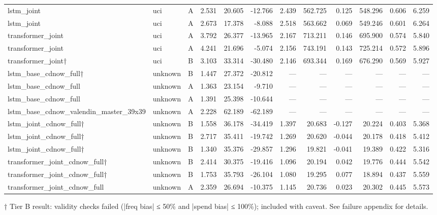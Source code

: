\begin{table}
\begin{tabular}{lllrrrrrrrrr}
lstm_joint & uci & A & 2.531 & 20.605 & -12.766 & 2.439 & 562.725 & 0.125 & 548.296 & 0.606 & 6.259 \\
lstm_joint & uci & A & 2.673 & 17.378 & -8.088 & 2.518 & 563.662 & 0.069 & 549.246 & 0.601 & 6.264 \\
transformer_joint & uci & A & 3.792 & 26.377 & -13.965 & 2.167 & 713.211 & 0.146 & 695.900 & 0.574 & 5.840 \\
transformer_joint & uci & A & 4.241 & 21.696 & -5.074 & 2.156 & 743.191 & 0.143 & 725.214 & 0.572 & 5.896 \\
transformer_joint† & uci & B & 3.103 & 33.314 & -30.480 & 2.146 & 693.344 & 0.169 & 676.290 & 0.569 & 5.927 \\
lstm_base_cdnow_full† & unknown & B & 1.447 & 27.372 & -20.812 & — & — & — & — & — & — \\
lstm_base_cdnow_full & unknown & A & 1.363 & 23.154 & -9.710 & — & — & — & — & — & — \\
lstm_base_cdnow_full & unknown & A & 1.391 & 25.398 & -10.644 & — & — & — & — & — & — \\
lstm_base_cdnow_valendin_master_39x39 & unknown & A & 2.228 & 62.189 & -62.189 & — & — & — & — & — & — \\
lstm_joint_cdnow_full† & unknown & B & 1.558 & 36.178 & -34.419 & 1.397 & 20.683 & -0.127 & 20.224 & 0.403 & 5.368 \\
lstm_joint_cdnow_full† & unknown & B & 2.717 & 35.411 & -19.742 & 1.269 & 20.620 & -0.044 & 20.178 & 0.418 & 5.412 \\
lstm_joint_cdnow_full† & unknown & B & 1.340 & 35.376 & -29.857 & 1.296 & 19.821 & -0.041 & 19.389 & 0.422 & 5.316 \\
transformer_joint_cdnow_full† & unknown & B & 2.414 & 30.375 & -19.416 & 1.096 & 20.194 & 0.042 & 19.776 & 0.444 & 5.542 \\
transformer_joint_cdnow_full† & unknown & B & 1.753 & 35.793 & -26.104 & 1.080 & 19.295 & 0.077 & 18.894 & 0.437 & 5.559 \\
transformer_joint_cdnow_full & unknown & A & 2.359 & 26.694 & -10.375 & 1.145 & 20.736 & 0.023 & 20.302 & 0.445 & 5.573 \\
\bottomrule
\end{tabular}
\end{table}
\begin{tablenotes}\small
\item[†] Tier B result: validity checks failed (|freq bias| ≤ 50\% and |spend bias| ≤ 100\%); included with caveat. See failure appendix for details.
\end{tablenotes}
